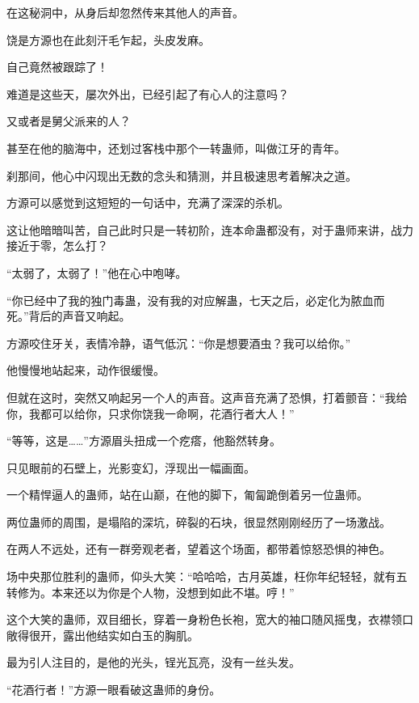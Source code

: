 
\begin{this_body}

在这秘洞中，从身后却忽然传来其他人的声音。

饶是方源也在此刻汗毛乍起，头皮发麻。

自己竟然被跟踪了！

难道是这些天，屡次外出，已经引起了有心人的注意吗？

又或者是舅父派来的人？

甚至在他的脑海中，还划过客栈中那个一转蛊师，叫做江牙的青年。

刹那间，他心中闪现出无数的念头和猜测，并且极速思考着解决之道。

方源可以感觉到这短短的一句话中，充满了深深的杀机。

这让他暗暗叫苦，自己此时只是一转初阶，连本命蛊都没有，对于蛊师来讲，战力接近于零，怎么打？

“太弱了，太弱了！”他在心中咆哮。

“你已经中了我的独门毒蛊，没有我的对应解蛊，七天之后，必定化为脓血而死。”背后的声音又响起。

方源咬住牙关，表情冷静，语气低沉：“你是想要酒虫？我可以给你。”

他慢慢地站起来，动作很缓慢。

但就在这时，突然又响起另一个人的声音。这声音充满了恐惧，打着颤音：“我给你，我都可以给你，只求你饶我一命啊，花酒行者大人！”

“等等，这是……”方源眉头扭成一个疙瘩，他豁然转身。

只见眼前的石壁上，光影变幻，浮现出一幅画面。

一个精悍逼人的蛊师，站在山巅，在他的脚下，匍匐跪倒着另一位蛊师。

两位蛊师的周围，是塌陷的深坑，碎裂的石块，很显然刚刚经历了一场激战。

在两人不远处，还有一群旁观老者，望着这个场面，都带着惊怒恐惧的神色。

场中央那位胜利的蛊师，仰头大笑：“哈哈哈，古月英雄，枉你年纪轻轻，就有五转修为。本来还以为你是个人物，没想到如此不堪。哼！”

这个大笑的蛊师，双目细长，穿着一身粉色长袍，宽大的袖口随风摇曳，衣襟领口敞得很开，露出他结实如白玉的胸肌。

最为引人注目的，是他的光头，锃光瓦亮，没有一丝头发。

“花酒行者！”方源一眼看破这蛊师的身份。


\end{this_body}
